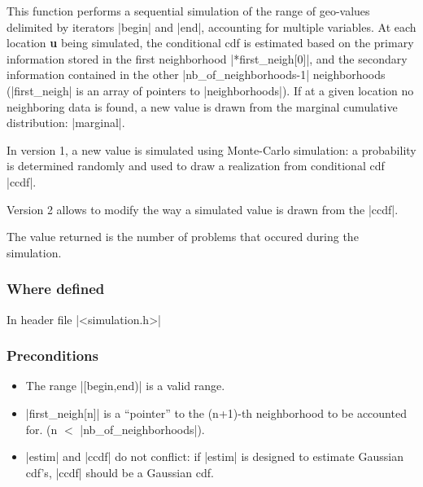 \documentclass[12pt,twoside]{report}
\newcommand{\loc}[1]{{\bf #1}}
\begin{document}
This function performs a sequential simulation of the range of geo-values delimited by iterators |begin| and |end|, accounting for multiple variables. At each location \loc{u} being simulated, the conditional cdf is estimated based on the primary information stored in the first neighborhood |*first_neigh[0]|, and the secondary information contained in the other |nb_of_neighborhoods-1| neighborhoods (|first_neigh| is an array of pointers to |neighborhoods|). If at a given location no neighboring data is found, a new value is drawn from the marginal cumulative distribution: |marginal|.

In version 1, a new value is simulated using Monte-Carlo simulation: a probability is determined randomly and used to draw a realization from conditional cdf |ccdf|.

Version 2 allows to modify the way a simulated value is drawn from the |ccdf|. 

The value returned is the number of problems that occured during the simulation.

\htmlrule[CLEAR=all]  \subsubsection*{Where defined}
In header file |<simulation.h>|


\htmlrule[CLEAR=all]  \subsubsection*{Preconditions}
\begin{itemize}
\item The range |[begin,end)| is a valid range.

\item |first_neigh[n]| is a ``pointer'' to the (n+1)-th neighborhood to be accounted for. (n $<$ |nb_of_neighborhoods|).

\item |estim| and |ccdf| do not conflict: if |estim| is designed to estimate Gaussian cdf's, |ccdf| should be a Gaussian cdf.
\end{itemize}
\end{document}
